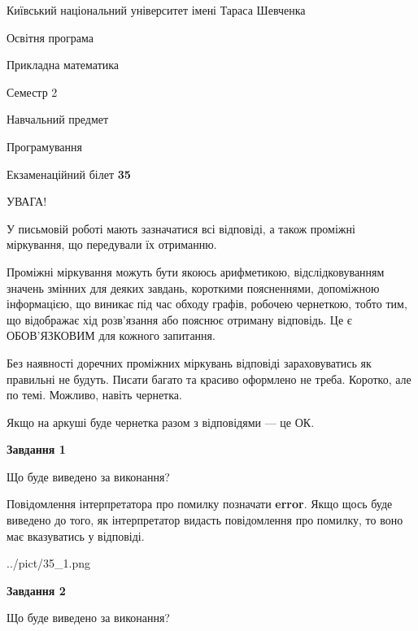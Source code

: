 \documentclass[12pt, ukrainian]{article}
\begin{document}
{{\begin {small}\par
{ \center  Київський національний університет імені Тараса Шевченка \par}
{\parbox {5 cm}{Освітня програма \hfill}{\parbox {7 cm}{Прикладна математика \hfill}}\parbox {6 cm}{\hfill Семестр 2}}\par
{\parbox {5 cm} {Навчальний предмет \hfill}\parbox {7 cm}{Програмування \hfill}\parbox {6cm}{\hfill}\par}\vspace{-7pt} \end{small}}{\center Екзаменаційний білет \No \textbf
{ 35 }\par}}
{
\begin {large}
УВАГА!

У письмовій роботі мають зазначатися всі відповіді, а також проміжні міркування, що передували їх отриманню.

Проміжні міркування можуть бути якоюсь арифметикою, відслідковуванням зна\-чень змінних для деяких завдань,
короткими поясненнями, допоміжною інформацією, що виникає під час обходу графів, робочею чернеткою,
тобто тим, що відображає хід розв’язання або пояснює отриману відповідь.
Це є ОБОВ’ЯЗКОВИМ для кожного запитання.

Без наявності доречних проміжних міркувань відповіді зараховуватись як правиль\-ні не будуть.
Писати багато та красиво оформлено не треба. Коротко, але по темі. Можли\-во, навіть чернетка.

Якщо на аркуші буде чернетка разом з відповідями --- це ОК.

\newpage

{\begin {center}\textbf{Завдання 1}\end {center}}\par
Що буде виведено за виконання?

Повідомлення інтерпретатора про помилку позначати \textbf{error}.
Якщо щось буде виведено до того, як інтерпретатор видасть повідомлення про помилку, 
то воно має вказуватись у відповіді. \par


\begin{center}
	{../pict/35_1.png}
\end{center}
\newpage

{\begin {center}\textbf{Завдання 2}\end {center}}\par
Що буде виведено за виконання?


\end{large}}
\end{document}
